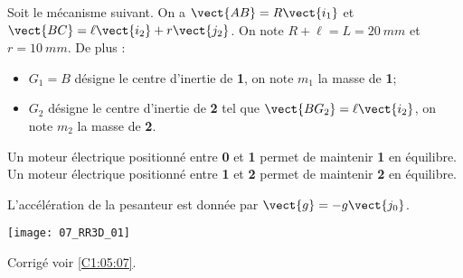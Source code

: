 \normalfalse \difficiletrue \tdifficilefalse
\correctionfalse


\setcounter{question}{0}
\ifcorrection
\else
{}
\fi

\ifprof
\else
Soit le mécanisme suivant. On a $\vect{AB}=R\vect{i_1}$ et $\vect{BC}=\ell\vect{i_2}+r\vect{j_2}$. On note $R+\ell=L = \SI{20}{mm}$ et $r=\SI{10}{mm}$. De plus :
\begin{itemize}
\item $G_1=B$ désigne le centre d'inertie de \textbf{1}, on note $m_1$ la masse de \textbf{1};%
\item $G_2$ désigne le centre d'inertie de \textbf{2} tel que  $\vect{BG_2}=\ell\vect{i_2}$, on note $m_2$ la masse de \textbf{2}.%
\end{itemize}

Un moteur électrique positionné entre \textbf{0} et \textbf{1} permet de maintenir \textbf{1} en équilibre.
Un moteur électrique positionné entre \textbf{1} et \textbf{2} permet de maintenir \textbf{2} en équilibre.

L'accélération de la pesanteur est donnée par $\vect{g}=-g\vect{j_0}$.

\begin{center}
\texttt{[image: 07\_RR3D\_01]}
\end{center}
\fi

\ifprof
\else
\fi

\ifprof
\else
\fi

\ifprof
\else
\fi

\ifprof
\else
\begin{flushright}
\footnotesize{Corrigé  voir \ref{C1:05:07}.}
\end{flushright}%
\fi